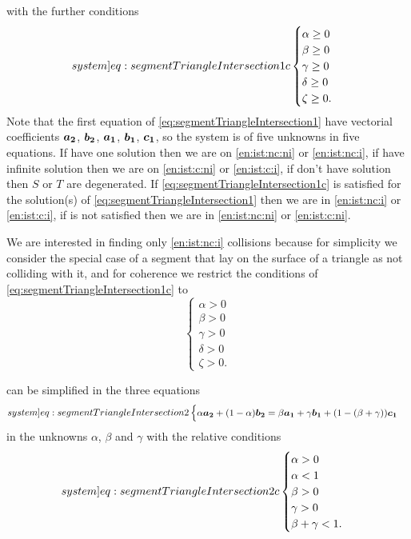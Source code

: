 \documentclass[dissertation.tex]{subfiles}
\begin{document}
with the further conditions
\begin{equation}\label[system]{eq:segmentTriangleIntersection1c}
  \begin{cases}
    \alpha \ge 0\\
    \beta \ge 0\\
    \gamma \ge 0\\
    \delta \ge 0\\
    \zeta \ge 0.
  \end{cases}
\end{equation}
Note that the first equation of
\cref{eq:segmentTriangleIntersection1} have vectorial coefficients
$\boldsymbol{a_2}$, $\boldsymbol{b_2}$, $\boldsymbol{a_1}$, $\boldsymbol{b_1}$, $\boldsymbol{c_1}$, so the
system is of five unknowns in five equations. If
 have one solution then we are
on \cref{en:ist:nc:ni} or \cref{en:ist:nc:i}, if have infinite
solution then we are on \cref{en:ist:c:ni} or \cref{en:ist:c:i}, if
don't have solution then $S$ or $T$ are degenerated. If
\cref{eq:segmentTriangleIntersection1c} is satisfied for the solution(s)
of \cref{eq:segmentTriangleIntersection1} then we are in
\cref{en:ist:nc:i} or \cref{en:ist:c:i}, if is not satisfied then we
are in \cref{en:ist:nc:ni} or \cref{en:ist:c:ni}.

We are interested in finding only \cref{en:ist:nc:i} collisions because for
simplicity we consider the special case of a segment that lay on the
surface of a triangle as not colliding with it, and for coherence we
restrict the conditions of \cref{eq:segmentTriangleIntersection1c} to
\begin{equation}
  \begin{cases}
    \alpha > 0\\
    \beta > 0\\
    \gamma > 0\\
    \delta > 0\\
    \zeta > 0.
  \end{cases}
\end{equation}

 can be simplified in the three
equations 
\begin{equation}\label[system]{eq:segmentTriangleIntersection2}
  \begin{cases}
    \alpha \ve{a_2} + (1-\alpha)\ve{b_2}=\beta\ve{a_1}+\gamma\ve{b_1}+(1-(\beta+\gamma))\ve{c_1} \\
  \end{cases}
\end{equation}
in the unknowns $\alpha$, $\beta$ and $\gamma$ with the relative conditions
\begin{equation}\label[system]{eq:segmentTriangleIntersection2c}
  \begin{cases}
    \alpha > 0\\
    \alpha < 1\\
    \beta > 0\\
    \gamma > 0\\
    \beta+\gamma<1.
  \end{cases}
\end{equation}
\end{document}
